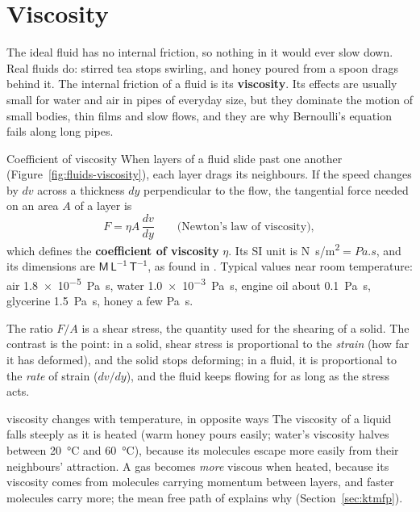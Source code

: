 \section{Viscosity}\label{sec:viscosity}

The ideal fluid has no internal friction, so nothing in it would ever slow down. Real fluids do: stirred
tea stops swirling, and honey poured from a spoon drags behind it. The internal friction of a fluid is its
\textbf{viscosity}. Its effects are usually small for water and air in pipes of everyday size, but they
dominate the motion of small bodies, thin films and slow flows, and they are why Bernoulli's equation fails
along long pipes.

\begin{figure}[htbp]
\centering
{}
\end{figure}

\begin{defbox}{Coefficient of viscosity}
When layers of a fluid slide past one another (Figure~\ref{fig:fluids-viscosity}), each layer drags its
neighbours. If the speed changes by $dv$ across a thickness $dy$ perpendicular to the flow, the tangential
force needed on an area $A$ of a layer is
\[
F=\eta A\,\frac{dv}{dy}\qquad\text{(Newton's law of viscosity)},
\]
which defines the \textbf{coefficient of viscosity} $\eta$. Its SI unit is \si{N.s/m^2}$=\si{Pa.s}$, and its
dimensions are $\mathsf{M\,L^{-1}\,T^{-1}}$, as found in . Typical values near room
temperature: air \SI{1.8e-5}{Pa.s}, water \SI{1.0e-3}{Pa.s}, engine oil about \SI{0.1}{Pa.s}, glycerine
\SI{1.5}{Pa.s}, honey a few \si{Pa.s}.
\end{defbox}

The ratio $F/A$ is a shear stress, the quantity  used for the shearing of a solid. The
contrast is the point: in a solid, shear stress is proportional to the \emph{strain} (how far it has
deformed), and the solid stops deforming; in a fluid, it is proportional to the \emph{rate} of strain
($dv/dy$), and the fluid keeps flowing for as long as the stress acts.

\begin{trapbox}{viscosity changes with temperature, in opposite ways}
The viscosity of a liquid falls steeply as it is heated (warm honey pours easily; water's viscosity halves
between \SI{20}{\celsius} and \SI{60}{\celsius}), because its molecules escape more easily from their
neighbours' attraction. A gas becomes \emph{more} viscous when heated, because its viscosity comes from
molecules carrying momentum between layers, and faster molecules carry more; the mean free path of  explains why
(Section~\ref{sec:ktmfp}).
\end{trapbox}

